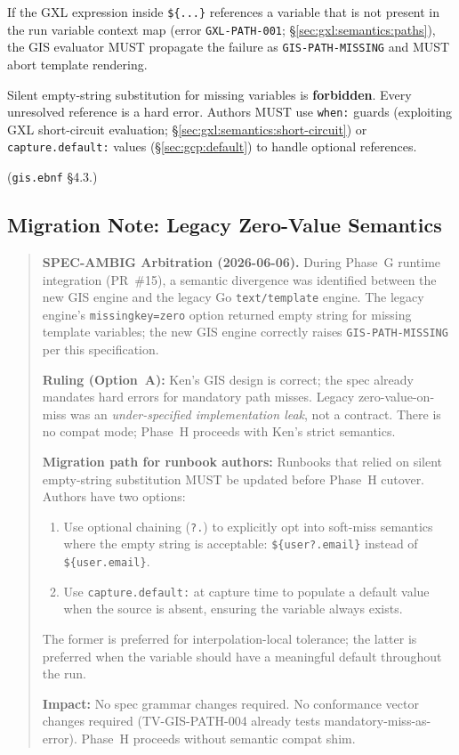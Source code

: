 If the GXL expression inside \texttt{\$\{...\}} references a variable
that is not present in the run variable context map (error
\texttt{GXL-PATH-001}; \S\ref{sec:gxl:semantics:paths}), the GIS evaluator
MUST propagate the failure as \texttt{GIS-PATH-MISSING} and MUST abort
template rendering.

Silent empty-string substitution for missing variables is \textbf{forbidden}.
Every unresolved reference is a hard error.
Authors MUST use \texttt{when:} guards (exploiting GXL short-circuit
evaluation; \S\ref{sec:gxl:semantics:short-circuit}) or
\texttt{capture.default:} values (\S\ref{sec:gcp:default}) to handle
optional references.

(\texttt{gis.ebnf} \S4.3.)

\subsection{Migration Note: Legacy Zero-Value Semantics}
\label{subsec:gis:migration-legacy}

\begin{quote}
\noindent\textbf{SPEC-AMBIG Arbitration (2026-06-06).}
During Phase~G runtime integration (PR~\#15), a semantic divergence was
identified between the new GIS engine and the legacy Go \texttt{text/template}
engine.  The legacy engine's \texttt{missingkey=zero} option returned empty
string for missing template variables; the new GIS engine correctly raises
\texttt{GIS-PATH-MISSING} per this specification.

\noindent\textbf{Ruling (Option~A):}
Ken's GIS design is correct; the spec already mandates hard errors for
mandatory path misses.  Legacy zero-value-on-miss was an \emph{under-specified
implementation leak}, not a contract.  There is no compat mode; Phase~H
proceeds with Ken's strict semantics.

\noindent\textbf{Migration path for runbook authors:}
Runbooks that relied on silent empty-string substitution MUST be updated
before Phase~H cutover.  Authors have two options:
\begin{enumerate}
  \item Use optional chaining (\texttt{?.}) to explicitly opt into soft-miss
        semantics where the empty string is acceptable:
        \texttt{\$\{user?.email\}} instead of \texttt{\$\{user.email\}}.
  \item Use \texttt{capture.default:} at capture time to populate a default
        value when the source is absent, ensuring the variable always exists.
\end{enumerate}
The former is preferred for interpolation-local tolerance; the latter is
preferred when the variable should have a meaningful default throughout the run.

\noindent\textbf{Impact:}  No spec grammar changes required.  No conformance
vector changes required (TV-GIS-PATH-004 already tests mandatory-miss-as-error).
Phase~H proceeds without semantic compat shim.
\end{quote}

